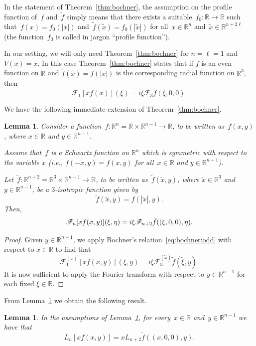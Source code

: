 \documentclass[a4paper,12pt,reqno]{amsart}
\numberwithin{equation}{section}
\newtheorem{lemma}[theorem]{Lemma}
\theoremstyle{definition}
\theoremstyle{notation}
\newcommand{\fourier}{\mathscr{F}}
\newcommand{\R}{\mathds{R}}
\begin{document}
In the statement of Theorem~\ref{thm:bochner}, the assumption on the profile function of~$f$ and~$\tilde f$ simply means that
there exists a suitable~$f_0:\R\to\R$ such that~$f(x)=f_0(|x|)$ and~$\tilde f(\tilde x)=f_0(|\tilde x|)$ for all~$x\in\R^n$ and~$\tilde x\in\R^{n+2\ell}$ (the function~$f_0$ is called in jargon ``profile function'').


In our setting, we will only need Theorem~\ref{thm:bochner} for $n= \ell = 1$ and $V(x) = x$. In this case Theorem~\ref{thm:bochner} states that if $f$ is an even function on $\R$ and $\tilde{f}(\tilde{x}) = f(|x|)$ is the corresponding radial function on $\R^3$, then
\begin{equation}
\label{eq:bochner:odd}
 \fourier_1[x f(x)](\xi) = i \xi \fourier_3 \tilde{f}(\xi, 0, 0) .
\end{equation}


We have the following immediate extension of Theorem~\ref{thm:bochner}.


\begin{lemma}
\label{lem:odd:fourier}
Consider a function~$f:\R^n=\R\times\R^{n-1}\to\R$,
to be written as~$f(x, y)$, where $x \in \R$ and $y \in \R^{n - 1}$.


Assume that~$f$ is a Schwartz function on $\R^n$ which is symmetric with respect to the variable $x$ (i.e., $f(-x, y) = f(x, y)$
for all~$x \in \R$ and $y \in \R^{n - 1}$).


Let~$\tilde f:\R^{n+2}=\R^3\times\R^{n-1}\to\R$,
to be written as~$\tilde{f}(\tilde{x}, y)$, where $\tilde{x} \in \R^3$ and $y \in \R^{n - 1}$, be a $3$-isotropic function given by
\[
 \tilde{f}(\tilde{x}, y) = f(|\tilde{x}|, y) .
\]
Then,
\[
 \fourier_n[x f(x, y)](\xi, \eta) = i \xi \fourier_{n + 2} \tilde{f}((\xi, 0, 0), \eta) . \qedhere
\]
\end{lemma}


\begin{proof}
Given $y \in \R^{n - 1}$, we apply Bochner's relation~\eqref{eq:bochner:odd} with respect to $x \in \R$ to find that
\[
 \fourier_1^{(x)}[x f(x, y)](\xi, y) = i \xi \fourier_3^{(\tilde{x})} \tilde{f}(\tilde{\xi}, y) .
\]
It is now sufficient to apply the Fourier transform with respect to $y \in \R^{n - 1}$ for each fixed $\xi \in \R$.
\end{proof}


From Lemma~\ref{lem:odd:fourier} we obtain the following result. 


\begin{lemma}
\label{lem:odd:operator}
In the assumptions of Lemma~\ref{lem:odd:fourier}, for every~$x\in\R$ and~$y\in\R^{n-1}$ we have that
\[
 L_n[x f(x, y)] = x L_{n + 2} \tilde{f}((x, 0, 0), y) .
\]
\end{lemma}
\end{document}
